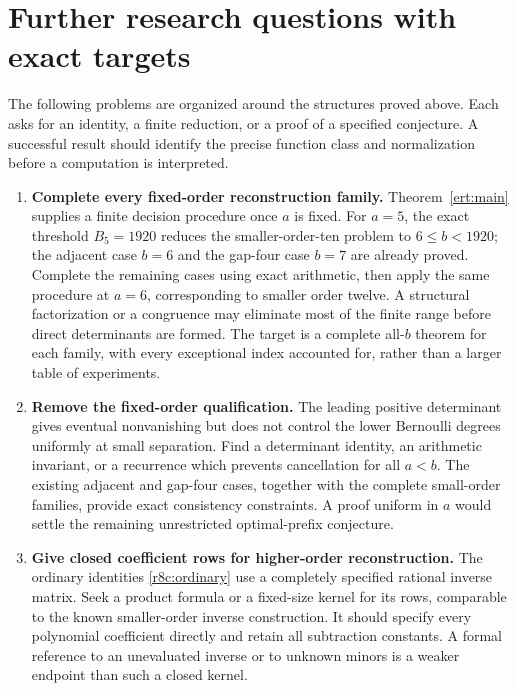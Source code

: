 \section{Further research questions with exact targets}
\label{sec:research}

The following problems are organized around the structures proved above.
Each asks for an identity, a finite reduction, or a proof of a specified
conjecture.  A successful result should identify the precise function
class and normalization before a computation is interpreted.

\begin{enumerate}[leftmargin=*,label=\textbf{R\arabic*.}]
\item \textbf{Complete every fixed-order reconstruction family.}
Theorem~\ref{ert:main} supplies a finite decision procedure once $a$
is fixed. For $a=5$, the exact threshold $B_5=1920$ reduces the
smaller-order-ten problem to $6\le b<1920$; the adjacent case
$b=6$ and the gap-four case $b=7$ are already proved. Complete the
remaining cases using exact arithmetic, then apply the same procedure
at $a=6$, corresponding to smaller order twelve. A structural
factorization or a congruence may eliminate most of the finite range
before direct determinants are formed.  The target is a complete
all-$b$ theorem for each family, with every exceptional index accounted
for, rather than a larger table of experiments.

\item \textbf{Remove the fixed-order qualification.}
The leading positive determinant gives eventual nonvanishing but does
not control the lower Bernoulli degrees uniformly at small separation.
Find a determinant identity, an arithmetic invariant, or a recurrence
which prevents cancellation for all $a<b$.  The existing adjacent
and gap-four cases, together with the complete small-order families,
provide exact consistency constraints.  A proof uniform in $a$ would
settle the remaining unrestricted optimal-prefix conjecture.

\item \textbf{Give closed coefficient rows for higher-order reconstruction.}
The ordinary identities \eqref{r8c:ordinary} use a completely specified
rational inverse matrix.  Seek a product formula or a fixed-size kernel
for its rows, comparable to the known smaller-order inverse construction.
It should specify every polynomial coefficient directly and retain all
subtraction constants.  A formal reference to an unevaluated inverse
or to unknown minors is a weaker endpoint than such a closed kernel.


\end{enumerate}
